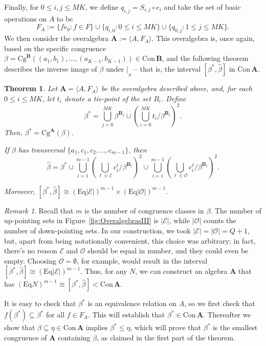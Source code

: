 \documentclass[cm,dissertation,actual,final]{uhthesis}
\theoremstyle{plain}
\newtheorem{theorem}{Theorem}[section]
\theoremstyle{definition}
\newcounter{claim}
\theoremstyle{remark}
\newtheorem*{remark}{Remark}
\numberwithin{theorem}{section}
\numberwithin{claim}{chapter}
\numberwithin{equation}{section}
\numberwithin{conjecture}{chapter}
\newcommand{\<}{\ensuremath{\langle}}
\renewcommand{\>}{\ensuremath{\rangle}}
\renewcommand{\leq}{\ensuremath{\leqslant}}
\newcommand{\Eq}{\ensuremath{\mathrm{Eq}}}
\newcommand{\Cg}{\ensuremath{\mathrm{Cg}}}
\newcommand{\Con}{\ensuremath{\mathrm{Con\,}}}
\newcommand{\0}{\ensuremath{\mathbf{0}}}
\newcommand{\1}{\ensuremath{\mathbf{1}}}
\newcommand{\2}{\ensuremath{\mathbf{2}}}
\newcommand{\3}{\ensuremath{\mathbf{3}}}
\newcommand{\4}{\ensuremath{\mathbf{4}}}
\newcommand{\5}{\ensuremath{\mathbf{5}}}
\newcommand{\bA}{\ensuremath{\mathbf{A}}}
\newcommand{\bB}{\ensuremath{\mathbf{B}}}
\newcommand{\sE}{\ensuremath{\mathscr{E}}}
\newcommand{\sO}{\ensuremath{\mathscr{O}}}
\newcommand{\resB}{\ensuremath{|_{_B}}}
\newcommand{\hbeta}{\ensuremath{\widehat{\beta}}}
\begin{document}
Finally, for $0\leq i, j\leq MK$, we define
$q_{i,j}=S_{i,j}\circ e_i$ and take the set of basic operations on $A$ to be
\[
F_A := \{f e_0 : f\in F\}  \cup \{q_{i,0} : 0\leq i \leq MK\}\cup \{q_{0,j} : 1\leq j \leq MK\}.
\]
We then consider the overalgebra $\bA := \< A, F_A\>$.   This overalgebra is,
once again, based on the specific congruence
$\beta = \Cg^{\bB}((a_1, b_1), \dots, (a_{K-1},b_{K-1})) \in \Con \bB$, and the following
theorem describes the inverse image of $\beta$ under $\resB$ -- that is, 
the interval $[\beta^*,\hbeta]$ in $\Con \bA$.
\begin{theorem}
  \label{thm-overalgebras-iii}
  Let $\bA = \< A, F_A\>$ be the overalgebra described above,
  and, for each $0\leq i \leq MK$, let $t_i$ denote a tie-point of the set 
  $B_i$.  Define
  \[ \beta^* = \bigcup_{j=0}^{MK} \beta^{\bB_j} \cup 
  \left(\bigcup_{i=0}^{MK}t_i/\beta^{\bB_i}\right)^2.
  \]
  Then, $\beta^* = \Cg^{\bA}(\beta)$.

  If $\beta$ has transversal $\{a_1, c_1, c_2, \dots, c_{m-1}\}$, then
  \begin{equation}
    \label{eq:OA5}
    \widehat{\beta} = \beta^* 
    \cup 
    \bigcup_{i=1}^{m-1}\left(\bigcup_{\ell \in \sE} c_i^\ell/\beta^{\bB_{\ell}}\right)^2
    \cup 
    \bigcup_{i=1}^{m-1}\left(\bigcup_{\ell \in \sO}
    c_i^\ell/\beta^{\bB_{\ell}}\right)^2.
  \end{equation}

  Moreover, $[\beta^*, \widehat{\beta}] \cong (\Eq|\sE|)^{m-1} \times (\Eq|\sO|)^{m-1}$. 
\end{theorem}
\begin{remark}
  Recall that $m$ is the number of congruence classes in $\beta$.
  The number of up-pointing sets in Figure~\ref{fig:OveralgebrasIII}
  is $|\sE|$, while $|\sO|$ counts the number of
  down-pointing sets.  In our construction, we took 
  $|\sE| = |\sO| = Q+1$, but, apart from being notationally convenient, this
  choice was arbitrary; in fact, there's no reason $\sE$ and $\sO$ should be equal
  in number, and they could even be empty.  Choosing $\sO = \emptyset$, for
  example, would result in the interval 
  $[\beta^*, \widehat{\beta}] \cong (\Eq|\sE|)^{m-1}$.  Thus, for any $N$, we can
  construct an algebra $\bA$ that has
  $(\Eq N)^{m-1} \cong [\beta^*, \widehat{\beta}] < \Con \bA$.  

\end{remark}

It is easy to check that $\beta^*$ is an equivalence relation on $A$, so we first
check that $f(\beta^*)\subseteq 
\beta^*$ for all $f\in F_A$.  This will establish that $\beta^*\in \Con\bA$.
Thereafter we show that $\beta \subseteq \eta \in \Con\bA$ implies 
$\beta^*\leq \eta$, which will prove that $\beta^*$ is the smallest congruence
of $\bA$ containing $\beta$, as claimed in the first part of the theorem.
\end{document}
